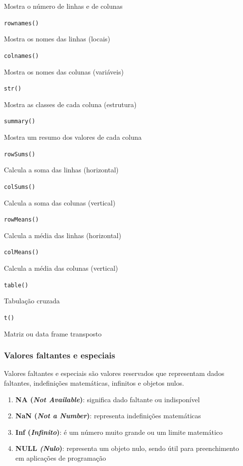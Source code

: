 \documentclass[
]{article}
\providecommand{\tightlist}{%
  \setlength{\itemsep}{0pt}\setlength{\parskip}{0pt}}
\begin{document}
Mostra o número de linhas e de colunas

\texttt{rownames()}

Mostra os nomes das linhas (locais)

\texttt{colnames()}

Mostra os nomes das colunas (variáveis)

\texttt{str()}

Mostra as classes de cada coluna (estrutura)

\texttt{summary()}

Mostra um resumo dos valores de cada coluna

\texttt{rowSums()}

Calcula a soma das linhas (horizontal)

\texttt{colSums()}

Calcula a soma das colunas (vertical)

\texttt{rowMeans()}

Calcula a média das linhas (horizontal)

\texttt{colMeans()}

Calcula a média das colunas (vertical)

\texttt{table()}

Tabulação cruzada

\texttt{t()}

Matriz ou data frame transposto

\hypertarget{valores-faltantes-e-especiais}{%
\subsubsection{Valores faltantes e especiais}\label{valores-faltantes-e-especiais}}

Valores faltantes e especiais são valores reservados que representam dados faltantes, indefinições matemáticas, infinitos e objetos nulos.

\begin{enumerate}
\def\labelenumi{\arabic{enumi}.}
\tightlist
\item
  \textbf{NA (\emph{Not Available})}: significa dado faltante ou indisponível
\item
  \textbf{NaN (\emph{Not a Number})}: representa indefinições matemáticas
\item
  \textbf{Inf (\emph{Infinito})}: é um número muito grande ou um limite matemático
\item
  \textbf{NULL \emph{(Nulo})}: representa um objeto nulo, sendo útil para preenchimento em aplicações de programação
\end{enumerate}
\end{document}
